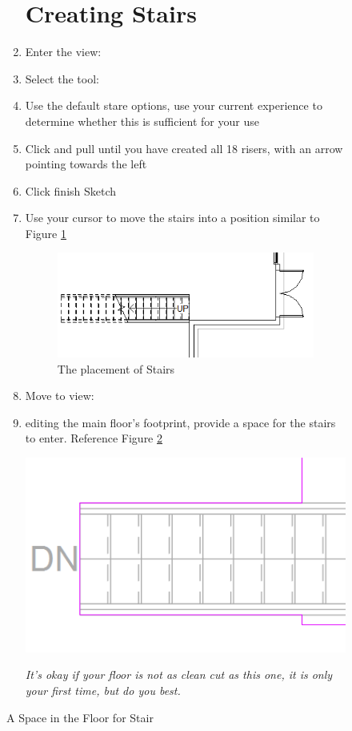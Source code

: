 \documentclass{tufte-book} %
\begin{document}
\begin{figure}
\begin{enumerate}
\section{Creating Stairs}
	\item Enter the view: 
	\item Select the tool: 
	\item Use the default stare options, use your current experience to determine whether this is sufficient for your use
	\item Click and pull until you have created all 18 risers, with an arrow pointing towards the left
	\item Click finish Sketch
	\item Use your cursor to move the stairs into a position similar to Figure \ref{fig:revstairinit}
	
	\begin{figure}
		\includegraphics[width=\linewidth]{revitstairsinit.PNG}
		\caption{The placement of Stairs}
		\label{fig:revstairinit}
	\end{figure}
	
	\item Move to view:
	\item editing the main floor's footprint, provide a space for the stairs to enter. Reference Figure \ref{fig:revstairspace}
	
	\begin{marginfigure}
		\includegraphics[width=\linewidth]{revitstairspace.png}
		\caption{A Space in the Floor for Stair}
		\emph{It's okay if your floor is not as clean cut as this one, it is only your first time, but do you best.}
		\label{fig:revstairspace}
	\end{marginfigure}
	

\end{enumerate}
\end{figure}
\end{document}
